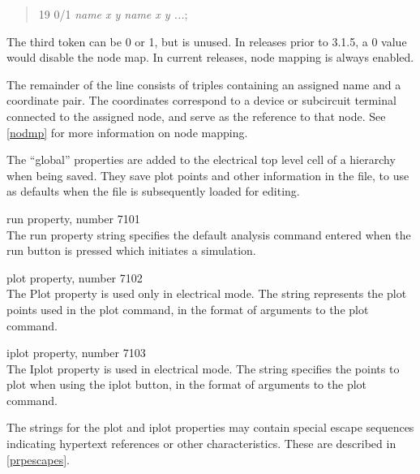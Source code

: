 \begin{description}
\begin{quote} 19 0/1 {\it name x y name x y ...\/};
\end{quote}

The third token can be 0 or 1, but is unused.  In releases prior to
3.1.5, a 0 value would disable the node map.  In current releases,
node mapping is always enabled.

The remainder of the line consists of triples containing an assigned
name and a coordinate pair.  The coordinates correspond to a device or
subcircuit terminal connected to the assigned node, and serve as the
reference to that node.  See \ref{nodmp} for more information on node
mapping.
\end{description}

The ``global'' properties are added to the electrical top level cell
of a hierarchy when being saved.  They save plot points and other
information in the file, to use as defaults when the file is
subsequently loaded for editing.

\begin{description}
\item{\et run} property, number 7101\\
The {\et run} property string specifies the default analysis command
entered when the {\cb run} button is pressed which initiates a
simulation.

\item{\et plot} property, number 7102\\
The {\et Plot} property is used only in electrical mode.  The string
represents the plot points used in the {\cb plot} command, in the
format of arguments to the {\WRspice} {\vt plot} command.

\item{\et iplot} property, number 7103\\
The {\et Iplot} property is used in electrical mode.  The string
specifies the points to plot when using the {\cb iplot} button, in the
format of arguments to the {\WRspice} {\vt plot} command.
\end{description}

The strings for the {\et plot} and {\et iplot} properties may contain
special escape sequences indicating hypertext references or other
characteristics.  These are described in \ref{prpescapes}.


